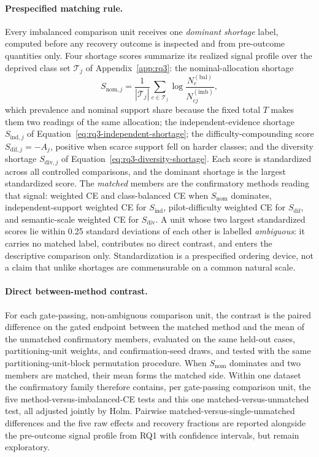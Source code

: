 \documentclass[11pt]{article}
\begin{document}
\paragraph{Prespecified matching rule.}
Every imbalanced comparison unit receives one \emph{dominant shortage} label, computed before any recovery outcome is inspected and from pre-outcome quantities only. Four shortage scores summarize its realized signal profile over the deprived class set $\mathcal T_j$ of Appendix~\ref{app:rq3}: the nominal-allocation shortage
\begin{equation}
  S_{\mathrm{nom},j}=\frac{1}{|\mathcal T_j|}\sum_{c\in\mathcal T_j}
  \log\frac{N^{(\mathrm{bal})}_{c}}{N^{(\mathrm{imb})}_{cj}},
  \label{eq:nominal-shortage}
\end{equation}
\noindent which prevalence and nominal support share because the fixed total $T$ makes them two readings of the same allocation; the independent-evidence shortage $S_{\mathrm{ind},j}$ of Equation~\eqref{eq:rq3-independent-shortage}; the difficulty-compounding score $S_{\mathrm{dif},j}=-A_j$, positive when scarce support fell on harder classes; and the diversity shortage $S_{\mathrm{div},j}$ of Equation~\eqref{eq:rq3-diversity-shortage}. Each score is standardized across all controlled comparisons, and the dominant shortage is the largest standardized score. The \emph{matched} members are the confirmatory methods reading that signal: weighted CE and class-balanced CE when $S_{\mathrm{nom}}$ dominates, independent-support weighted CE for $S_{\mathrm{ind}}$, pilot-difficulty weighted CE for $S_{\mathrm{dif}}$, and semantic-scale weighted CE for $S_{\mathrm{div}}$. A unit whose two largest standardized scores lie within \num{0.25} standard deviations of each other is labelled \emph{ambiguous}: it carries no matched label, contributes no direct contrast, and enters the descriptive comparison only. Standardization is a prespecified ordering device, not a claim that unlike shortages are commensurable on a common natural scale.

\paragraph{Direct between-method contrast.}
For each gate-passing, non-ambiguous comparison unit, the contrast is the paired difference on the gated endpoint between the matched method and the mean of the unmatched confirmatory members, evaluated on the same held-out cases, partitioning-unit weights, and confirmation-seed draws, and tested with the same partitioning-unit-block permutation procedure. When $S_{\mathrm{nom}}$ dominates and two members are matched, their mean forms the matched side. Within one dataset the confirmatory family therefore contains, per gate-passing comparison unit, the five method-versus-imbalanced-CE tests and this one matched-versus-unmatched test, all adjusted jointly by Holm. Pairwise matched-versus-single-unmatched differences and the five raw effects and recovery fractions are reported alongside the pre-outcome signal profile from RQ1 with confidence intervals, but remain exploratory.
\end{document}
